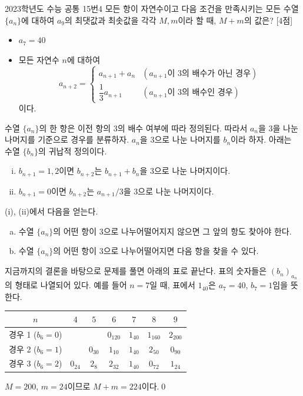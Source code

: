 \documentclass{article}
\begin{document}
\newpage
\begin{prob}{2023학년도 수능 공통 15번}{4}
	모든 항이 자연수이고 다음 조건을 만족시키는 모든 수열 $\{a_n\}$에 대하여 $a_9$의 최댓값과 최솟값을 각각 $M,m$이라 할 때, $M+m$의 값은? [4점]
	\begin{hint}
		\begin{itemize}
			\item[(가)] $a_7=40$
			\item[(나)] 모든 자연수 $n$에 대하여
				\[
					a_{n+2}=\begin{cases}
						a_{n+1}+a_n & (a_{n+1}\text{이 }3\text{의 배수가 아닌 경우}) \\[3pt]
						\dfrac{1}{3}a_{n+1} & (a_{n+1}\text{이 }3\text{의 배수인 경우})
					\end{cases}
				\]
				이다.
		\end{itemize}
	\end{hint}
\end{prob}

\begin{sol}
	수열 $\{a_n\}$의 한 항은 이전 항의 $3$의 배수 여부에 따라 정의된다. 따라서 $a_n$을 $3$을 나눈 나머지를 기준으로 경우를 분류하자. $a_n$을 $3$으로 나눈 나머지를 $b_n$이라 하자. 아래는 수열 $\{b_n\}$의 귀납적 정의이다.
	\begin{enumerate}[(i)]
		\item $b_{n+1}=1,2$이면 $b_{n+2}$는 $b_{n+1}+b_n$을 $3$으로 나눈 나머지이다.
		\item $b_{n+1}=0$이면 $b_{n+2}$는 $a_{n+1}/3$을 $3$으로 나눈 나머지이다.
	\end{enumerate}
	(i), (ii)에서 다음을 얻는다.
	\begin{enumerate}[(a)]
		\item 수열 $\{a_n\}$의 어떤 항이 $3$으로 나누어떨어지지 않으면 그 앞의 항도 찾아야 한다.
		\item 수열 $\{a_n\}$의 어떤 항이 $3$으로 나누어떨어지면 다음 항을 찾을 수 있다.
	\end{enumerate}
	지금까지의 결론을 바탕으로 문제를 풀면 아래의 표로 끝난다. 표의 숫자들은 $(b_n)_{a_n}$의 형태로 나열되어 있다. 예를 들어 $n=7$일 때, 표에서 $1_40$은 $a_7=40$, $b_7=1$임을 뜻한다.
	\begin{table}[H]
		\centering
		\begin{tabular}{c|cccccc}
			\toprule
			$n$ & $4$ & $5$ & $6$ & $7$ & $8$ & $9$ \\
			\midrule
			경우 1 ($b_6=0$) & & & $0_{120}$ & $1_{40}$ & $1_{160}$ & $2_{200}$ \\
			\midrule
			경우 2 ($b_6=1$) & & $0_{30}$ & $1_{10}$ & $1_{40}$ & $2_{50}$ & $0_{90}$ \\
			\midrule
			경우 3 ($b_6=2$) & $0_{24}$ & $2_8$ & $2_{32}$ & $1_{40}$ & $0_{72}$ & $1_{24}$ \\
			\bottomrule
		\end{tabular}
	\end{table} 
	$M=200$, $m=24$이므로 $M+m=224$이다.\qed
\end{sol}
\end{document}
